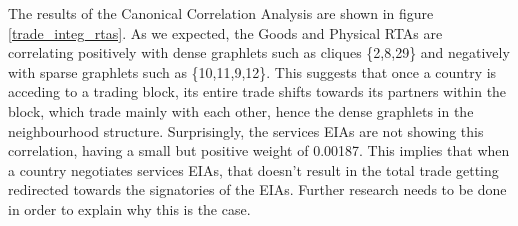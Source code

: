 The results of the Canonical Correlation Analysis are shown in figure \ref{trade_integ_rtas}. As we expected, the Goods and Physical RTAs are correlating positively with dense graphlets such as cliques \{2,8,29\} and negatively with sparse graphlets such as \{10,11,9,12\}. This suggests that once a country is acceding to a trading block, its entire trade shifts towards its partners within the block, which trade mainly with each other, hence the dense graphlets in the neighbourhood structure. Surprisingly, the services EIAs are not showing this correlation, having a small but positive weight of 0.00187. This implies that when a country negotiates services EIAs, that doesn't result in the total trade getting redirected towards the signatories of the EIAs. Further research needs to be done in order to explain why this is the case.


